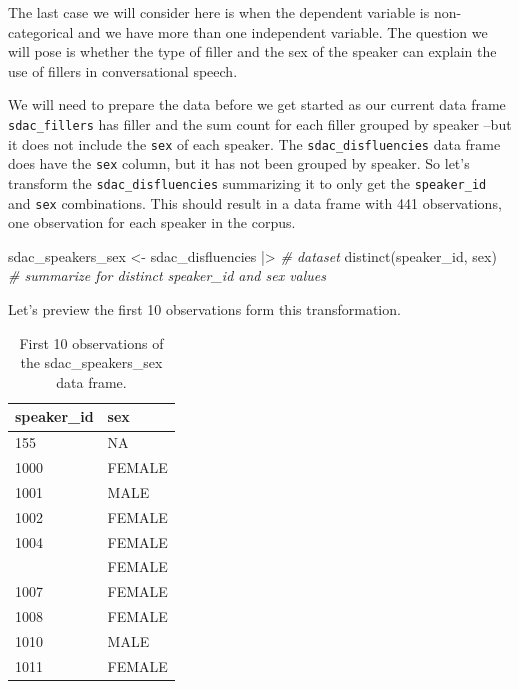 \documentclass[
  letterpaper,
]{scrbook}
\newenvironment{Shaded}{\begin{snugshade}}{\end{snugshade}}
\newcommand{\CommentTok}[1]{\textcolor[rgb]{0.00,0.00,0.00}{\textit{#1}}}
\newcommand{\FunctionTok}[1]{\textcolor[rgb]{0.00,0.00,0.00}{#1}}
\newcommand{\NormalTok}[1]{\textcolor[rgb]{0.00,0.00,0.00}{#1}}
\newcommand{\OtherTok}[1]{\textcolor[rgb]{0.00,0.00,0.00}{#1}}
\newcommand{\SpecialCharTok}[1]{\textcolor[rgb]{0.00,0.00,0.00}{#1}}
\begin{document}
The last case we will consider here is when the dependent variable is
non-categorical and we have more than one independent variable. The
question we will pose is whether the type of filler and the sex of the
speaker can explain the use of fillers in conversational speech.

We will need to prepare the data before we get started as our current
data frame \texttt{sdac\_fillers} has filler and the sum count for each
filler grouped by speaker --but it does not include the \texttt{sex} of
each speaker. The \texttt{sdac\_disfluencies} data frame does have the
\texttt{sex} column, but it has not been grouped by speaker. So let's
transform the \texttt{sdac\_disfluencies} summarizing it to only get the
\texttt{speaker\_id} and \texttt{sex} combinations. This should result
in a data frame with 441 observations, one observation for each speaker
in the corpus.

\begin{Shaded}
\begin{Highlighting}[]
\NormalTok{sdac\_speakers\_sex }\OtherTok{\textless{}{-}} 
\NormalTok{  sdac\_disfluencies }\SpecialCharTok{|\textgreater{}} \CommentTok{\# dataset}
  \FunctionTok{distinct}\NormalTok{(speaker\_id, sex) }\CommentTok{\# summarize for distinct \textasciigrave{}speaker\_id\textasciigrave{} and \textasciigrave{}sex\textasciigrave{} values}
\end{Highlighting}
\end{Shaded}

Let's preview the first 10 observations form this transformation.

\hypertarget{tbl-i-multi-cont-transform-sdac-preview}{}
\begin{table}
\caption{\label{tbl-i-multi-cont-transform-sdac-preview}First 10 observations of the sdac\_speakers\_sex data frame. }\tabularnewline

\centering
\begin{tabular}{ll}
\toprule
speaker\_id & sex\\
\midrule
155 & NA\\
1000 & FEMALE\\
1001 & MALE\\
1002 & FEMALE\\
1004 & FEMALE\\
\addlinespace
1005 & FEMALE\\
1007 & FEMALE\\
1008 & FEMALE\\
1010 & MALE\\
1011 & FEMALE\\
\bottomrule
\end{tabular}
\end{table}
\end{document}

